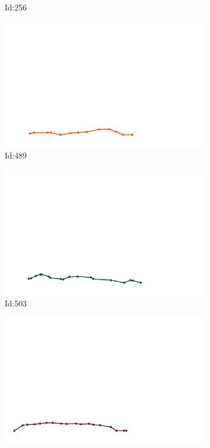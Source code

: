 \documentclass[12pt,twoside]{report}
\begin{document}
\begin{figure}
\begin{subfigure}[b]{0.20\textwidth}
\caption{Id:256}
\end{subfigure}
\begin{subfigure}[b]{0.20\textwidth}
\centering
\includegraphics[width=\textwidth]{../../trajectories/489.png}
\caption{Id:489}
\end{subfigure}
\begin{subfigure}[b]{0.20\textwidth}
\centering
\includegraphics[width=\textwidth]{../../trajectories/503.png}
\caption{Id:503}
\end{subfigure}
\begin{subfigure}[b]{0.20\textwidth}
\centering
\includegraphics[width=\textwidth]{../../trajectories/508.png}

\end{subfigure}
\end{figure}
\end{document}
